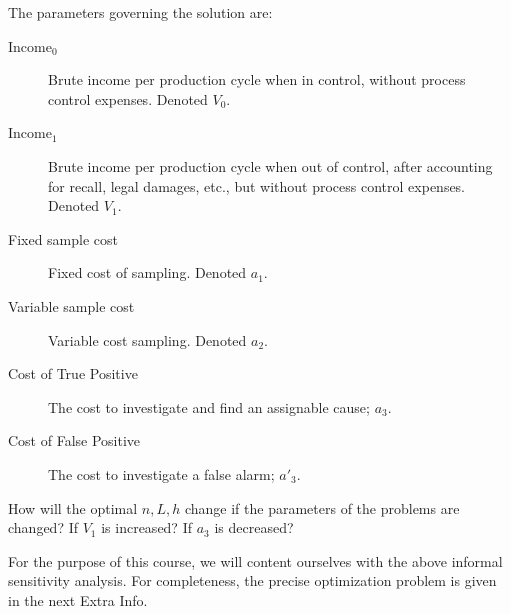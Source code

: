 The parameters governing the solution are:
\begin{description}
\item[Income$_0$ ] Brute income per production cycle when in control, without process control expenses. Denoted $V_0$.
\item[Income$_1$] Brute income per production cycle when out of control, after accounting for recall, legal damages, etc., but without process control expenses. Denoted $V_1$.
\item[Fixed sample cost] Fixed cost of sampling. Denoted $a_1$. 
\item[Variable sample cost] Variable cost sampling. Denoted $a_2$.
\item[Cost of True Positive] The cost to investigate and find an assignable cause; $a_3$.
\item[Cost of False Positive] The cost to investigate a false alarm; $a'_3$.
\end{description}


\begin{think}
How will the optimal $n,L,h$ change if the parameters of the problems are changed?
If $V_1$ is increased?
If $a_3$ is decreased?
\end{think}

For the purpose of this course, we will content ourselves with the above informal sensitivity analysis.
For completeness, the precise optimization problem is given in the next Extra Info.

